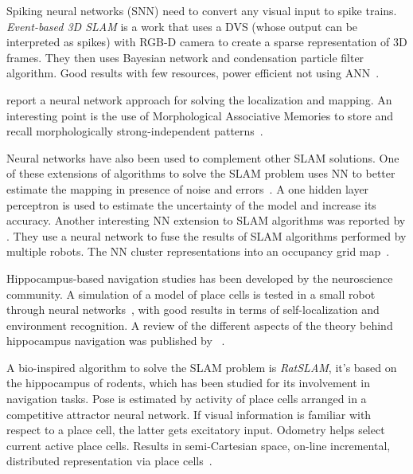 Spiking neural networks (SNN) need to convert any visual input to spike trains. \emph{Event-based 3D SLAM} is a work that uses a DVS (whose output can be interpreted as spikes) with RGB-D camera to create a sparse representation of 3D frames. They then uses Bayesian network and condensation particle filter algorithm. Good results with few resources, power efficient not using ANN~\cite{Weikersdorfer2014}.

\citeauthor{villaverde2006morphological} report a neural network approach for solving the localization and mapping. An interesting point is the use of Morphological Associative Memories to store and recall morphologically strong-independent patterns~\cite{villaverde2006morphological}. 

Neural networks have also been used to complement other SLAM solutions. One of these extensions of algorithms to solve the SLAM problem uses NN to better estimate the mapping in presence of noise and errors~\cite{choi2007neural}. A one hidden layer perceptron is used to estimate the uncertainty of the model and increase its accuracy. Another interesting NN extension to SLAM algorithms was reported by \citeauthor{saeedi2011neural}. They use a neural network to fuse the results of SLAM algorithms performed by multiple robots. The NN cluster representations into an occupancy grid map~\cite{saeedi2011neural}.

Hippocampus-based navigation studies has been developed by the neuroscience community. A simulation of a model of place cells is tested in a small robot through neural networks~\cite{burgess1997robotic}, with good results in terms of self-localization and environment recognition. A review of the different aspects of the theory behind hippocampus navigation was published by \citeauthor{sunderhauf2010learning}~\cite{sunderhauf2010learning}. 

A bio-inspired algorithm to solve the SLAM problem is \emph{RatSLAM}, it's based on the hippocampus of rodents, which has been studied for its involvement in navigation tasks. Pose is estimated by activity of place cells arranged in a competitive attractor neural network. If visual information is familiar with respect to a place cell, the latter gets excitatory input. Odometry helps select current active place cells. Results in semi-Cartesian space, on-line incremental, distributed representation via place cells~\cite{rat-slam,milford2008robot}.